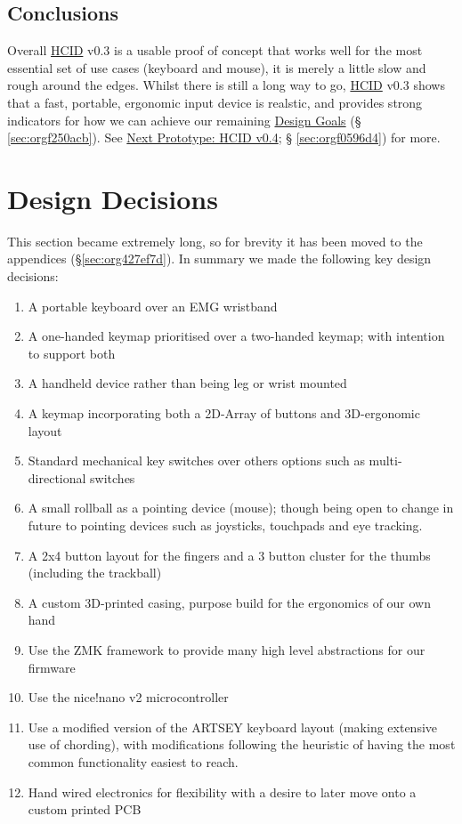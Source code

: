 \documentclass[logo,bsc,singlespacing,parskip]{infthesis}
\begin{document}
\section{Conclusions}
\label{sec:orgc11c21e}
Overall \hyperref[org0c83164]{HCID} v0.3 is a usable proof of concept that works well for the most essential set of use cases (keyboard and mouse), it is merely a little slow and rough around the edges.
Whilst there is still a long way to go, \hyperref[org0c83164]{HCID} v0.3 shows that a fast, portable, ergonomic input device is realstic, and provides strong indicators for how we can achieve our remaining \hyperref[sec:orgf250acb]{Design Goals} (§ \ref{sec:orgf250acb}). See \hyperref[sec:orgf0596d4]{Next Prototype: HCID v0.4}; § \ref{sec:orgf0596d4}) for more.
\chapter{Design Decisions}
\label{sec:org70f081f}
This section became extremely long, so for brevity it has been moved to the appendices (\S \ref{sec:org427ef7d}).
In summary we made the following key design decisions:
\begin{enumerate}
\item A portable keyboard over an EMG wristband
\item A one-handed keymap prioritised over a two-handed keymap; with intention to support both
\item A handheld device rather than being leg or wrist mounted
\item A keymap incorporating both a 2D-Array of buttons and 3D-ergonomic layout
\item Standard mechanical key switches over others options such as multi-directional switches
\item A small rollball as a pointing device (mouse); though being open to change in future to pointing devices such as joysticks, touchpads and eye tracking.
\item A 2x4 button layout for the fingers and a 3 button cluster for the thumbs (including the trackball)
\item A custom 3D-printed casing, purpose build for the ergonomics of our own hand
\item Use the ZMK framework \autocite{ZMKFirmware} to provide many high level abstractions for our firmware
\item Use the nice!nano v2 microcontroller \autocite{NiceNanoNice}
\item Use a modified version of the ARTSEY keyboard layout \autocite{ARTSEYEasyFast} (making extensive use of chording), with modifications following the heuristic of having the most common functionality easiest to reach.
\item Hand wired electronics for flexibility with a desire to later move onto a custom printed PCB
\end{enumerate}
\end{document}
